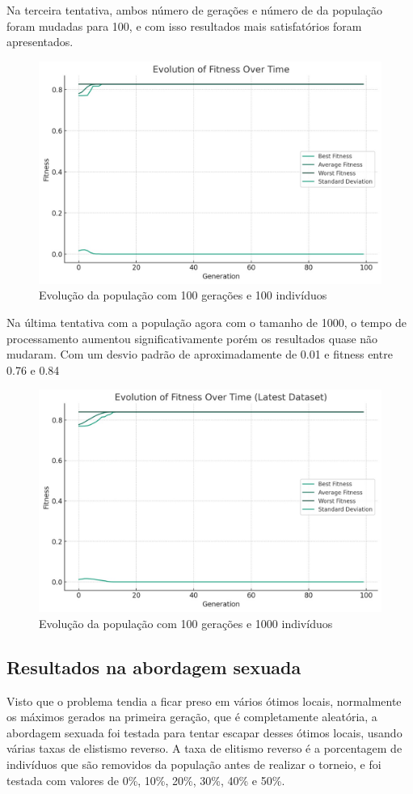 \documentclass[12pt]{article}
\begin{document}
Na terceira tentativa, ambos número de gerações e número de da população foram mudadas para 100, e com isso resultados mais satisfatórios foram apresentados.

\begin{figure}[H]
    \centering
    \includegraphics[width=0.5\linewidth]{3tentativa.png}
    \caption{Evolução da população com 100 gerações e 100 indivíduos}
    \label{fig:third-attempt}
\end{figure}

Na última tentativa com a população agora com o tamanho de 1000, o tempo de processamento aumentou significativamente porém os resultados quase não mudaram. Com um desvio padrão de aproximadamente de 0.01 e fitness entre 0.76 e 0.84

\begin{figure}[h]
    \centering
    \includegraphics[width=0.5\linewidth]{4tentativa.png}
    \caption{Evolução da população com 100 gerações e 1000 indivíduos}
    \label{fig:fourth-attempt}
\end{figure}

\subsection{Resultados na abordagem sexuada}

Visto que o problema tendia a ficar preso em vários ótimos locais, normalmente os máximos gerados na primeira geração, que é completamente aleatória, a abordagem sexuada foi testada para tentar escapar desses ótimos locais, usando várias taxas de elistismo reverso. A taxa de elitismo reverso é a porcentagem de indivíduos que são removidos da população antes de realizar o torneio, e foi testada com valores de 0\%, 10\%, 20\%, 30\%, 40\% e 50\%.
\end{document}
